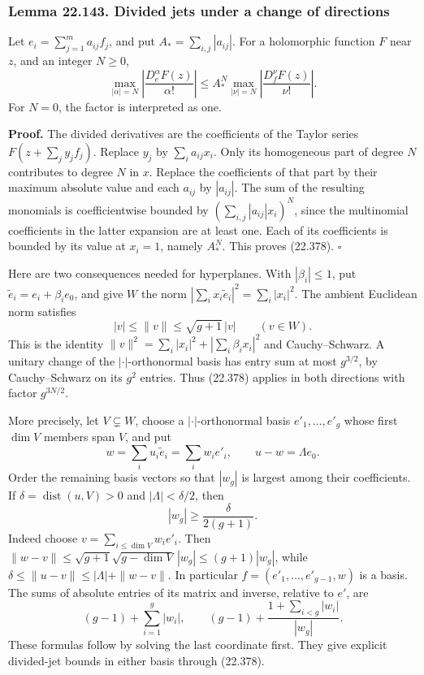 \documentclass[
  11pt,
  a4paper,
]{article}
\begin{document}
\subsubsection{Lemma 22.143. Divided jets under a change of
directions}\label{lemma-22.143.-divided-jets-under-a-change-of-directions}

Let \(e_i=\sum_{j=1}^m a_{ij}f_j\), and put \(A_*=\sum_{i,j}|a_{ij}|\).
For a holomorphic function \(F\) near \(z\), and an integer \(N\ge0\),
\[
 \max_{|\alpha|=N}
   \left|\frac{D_e^\alpha F(z)}{\alpha!}\right|
 \le A_*^N
 \max_{|\nu|=N}
   \left|\frac{D_f^\nu F(z)}{\nu!}\right|.
 \tag{22.378}
\] For \(N=0\), the factor is interpreted as one.

\textbf{Proof.} The divided derivatives are the coefficients of the
Taylor series \(F(z+\sum_j y_jf_j)\). Replace \(y_j\) by
\(\sum_i a_{ij}x_i\). Only its homogeneous part of degree \(N\)
contributes to degree \(N\) in \(x\). Replace the coefficients of that
part by their maximum absolute value and each \(a_{ij}\) by
\(|a_{ij}|\). The sum of the resulting monomials is coefficientwise
bounded by \((\sum_{i,j}|a_{ij}|x_i)^N\), since the multinomial
coefficients in the latter expansion are at least one. Each of its
coefficients is bounded by its value at \(x_i=1\), namely \(A_*^N\).
This proves (22.378). \(\square\)

Here are two consequences needed for hyperplanes. With
\(|\beta_i|\le1\), put \(\widetilde e_i=e_i+\beta_i e_0\), and give
\(W\) the norm \(|\sum_i x_i\widetilde e_i|^2=\sum_i|x_i|^2\). The
ambient Euclidean norm satisfies \[
 |v|\le\|v\|\le\sqrt{g+1}\,|v|\qquad(v\in W).
 \tag{22.379}
\] This is the identity \(\|v\|^2=\sum_i|x_i|^2+|\sum_i\beta_i x_i|^2\)
and Cauchy--Schwarz. A unitary change of the \(|\cdot|\)-orthonormal
basis has entry sum at most \(g^{3/2}\), by Cauchy--Schwarz on its
\(g^2\) entries. Thus (22.378) applies in both directions with factor
\(g^{3N/2}\).

More precisely, let \(V\subsetneq W\), choose a \(|\cdot|\)-orthonormal
basis \(e'_1,\ldots,e'_g\) whose first \(\dim V\) members span \(V\),
and put \[
 w=\sum_i u_i\widetilde e_i=\sum_i w_i e'_i,
 \qquad u-w=\Lambda e_0.
 \tag{22.380}
\] Order the remaining basis vectors so that \(|w_g|\) is largest among
their coefficients. If \(\delta=\operatorname{dist}(u,V)>0\) and
\(|\Lambda|<\delta/2\), then \[
 |w_g|\ge\frac{\delta}{2(g+1)}.
 \tag{22.381}
\] Indeed choose \(v=\sum_{i\le\dim V}w_i e'_i\). Then
\(\|w-v\|\le\sqrt{g+1}\sqrt{g-\dim V}\,|w_g|
\le(g+1)|w_g|\), while \(\delta\le\|u-v\|\le|\Lambda|+\|w-v\|\). In
particular \(f=(e'_1,\ldots,e'_{g-1},w)\) is a basis. The sums of
absolute entries of its matrix and inverse, relative to \(e'\), are \[
 (g-1)+\sum_{i=1}^g|w_i|,
 \qquad
 (g-1)+\frac{1+\sum_{i<g}|w_i|}{|w_g|}.
 \tag{22.382}
\] These formulas follow by solving the last coordinate first. They give
explicit divided-jet bounds in either basis through (22.378).
\end{document}
